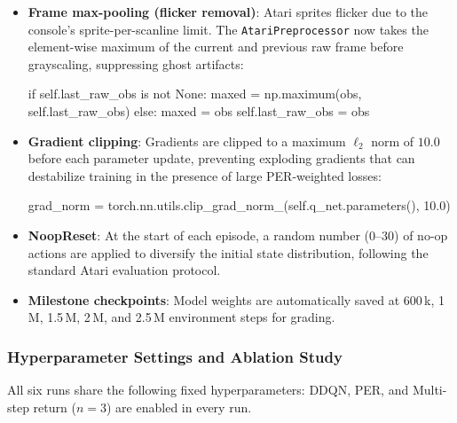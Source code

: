 \documentclass[12pt,a4paper]{report}
\begin{document}
\begin{itemize}[leftmargin=1.8em]
  \item \textbf{Frame max-pooling (flicker removal)}: Atari sprites flicker due to
        the console's sprite-per-scanline limit.
        The \texttt{AtariPreprocessor} now takes the element-wise maximum of the current
        and previous raw frame before grayscaling, suppressing ghost artifacts:
\begin{pycode}
if self.last_raw_obs is not None:
    maxed = np.maximum(obs, self.last_raw_obs)
else:
    maxed = obs
self.last_raw_obs = obs
\end{pycode}

  \item \textbf{Gradient clipping}: Gradients are clipped to a maximum $\ell_2$ norm
        of $10.0$ before each parameter update, preventing exploding gradients that
        can destabilize training in the presence of large PER-weighted losses:
\begin{pycode}
grad_norm = torch.nn.utils.clip_grad_norm_(self.q_net.parameters(), 10.0)
\end{pycode}

  \item \textbf{NoopReset}: At the start of each episode, a random number (0--30) of
        no-op actions are applied to diversify the initial state distribution,
        following the standard Atari evaluation protocol.

  \item \textbf{Milestone checkpoints}: Model weights are automatically saved at
        600\,k, 1\,M, 1.5\,M, 2\,M, and 2.5\,M environment steps for grading.
\end{itemize}

\subsubsection*{Hyperparameter Settings and Ablation Study}

All six runs share the following fixed hyperparameters:
DDQN, PER, and Multi-step return ($n=3$) are enabled in every run.
\end{document}
